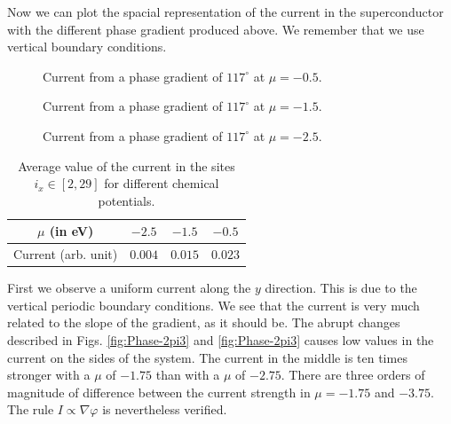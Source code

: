 \documentclass[..\main.tex]{subfile}
\begin{document}
Now we can plot the spacial representation of the current in the superconductor with the different phase gradient produced above. We remember
that we use vertical boundary conditions.
\begin{figure}[H]
    
    \caption{Current from a phase gradient of $117^{\circ}$ at $\mu = -0.5$.}
\end{figure}
\begin{figure}[H]
    
    \caption{Current from a phase gradient of $117^{\circ}$ at $\mu = -1.5$.}
\end{figure}
\begin{figure}[H]
    
    \caption{Current from a phase gradient of $117^{\circ}$ at $\mu = -2.5$.}
\end{figure}
\begin{table}[H]
    \centering
    \begin{tabular}{c||c|c|c}
        $\mu$ (in \si{\electronvolt}) & $-2.5$ & $-1.5$ & $-0.5$\\\hline
        Current (arb. unit)& $0.004$ & $0.015$ & $0.023$\\
    \end{tabular}
    \caption{Average value of the current in the sites $i_x\in[2,29]$ for different chemical potentials.}
\end{table}
First we observe a uniform current along the $y$ direction. This is due to the vertical periodic boundary conditions.
We see that the current is very much related to the slope of the gradient, as it should be. 
The abrupt changes described in Figs. \ref{fig:Phase-2pi3} and \ref{fig:Phase-2pi3} causes low values in the current on the sides of the system. 
The current in the middle is ten times stronger with a $\mu$ of $-1.75$ than with a $\mu$ of $-2.75$. There are three orders of magnitude
of difference between the current strength in $\mu = -1.75$ and $-3.75$. The rule $I\propto\nabla\varphi$ is nevertheless verified.\\
\end{document}
